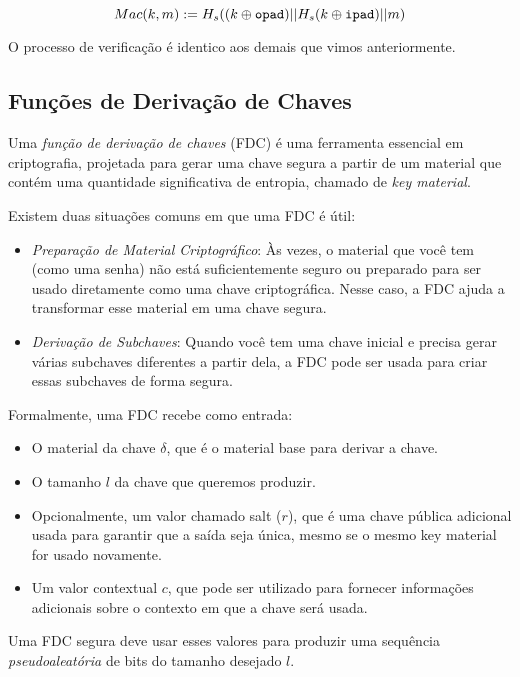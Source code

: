 \begin{displaymath}
Mac(k, m) := H_s((k \oplus \textrm{\tt opad}) || H_s(k \oplus \textrm{\tt ipad}) || m)
\end{displaymath}

O processo de verificação é identico aos demais que vimos anteriormente.

\subsection{Funções de Derivação de Chaves}
\label{sec:kdf}

Uma {\em função de derivação de chaves} (FDC) é uma ferramenta essencial em criptografia, projetada para gerar uma chave segura a partir de um material que contém uma quantidade significativa de entropia, chamado de {\em key material}.

Existem duas situações comuns em que uma FDC é útil:

\begin{itemize}
\item[] {\em Preparação de Material Criptográfico}:
  Às vezes, o material que você tem (como uma senha) não está suficientemente seguro ou preparado para ser usado diretamente como uma chave criptográfica.
  Nesse caso, a FDC ajuda a transformar esse material em uma chave segura.

\item[] {\em Derivação de Subchaves}:
  Quando você tem uma chave inicial e precisa gerar várias subchaves diferentes a partir dela, a FDC pode ser usada para criar essas subchaves de forma segura.
\end{itemize}

Formalmente, uma FDC recebe como entrada:

\begin{itemize}
\item O material da chave $\delta$, que é o material base para derivar a chave.
\item O tamanho $l$ da chave que queremos produzir.
\item Opcionalmente, um valor chamado salt ($r$), que é uma chave pública adicional usada para garantir que a saída seja única, mesmo se o mesmo key material for usado novamente.
\item Um valor contextual $c$, que pode ser utilizado para fornecer informações adicionais sobre o contexto em que a chave será usada.
\end{itemize}

Uma FDC segura deve usar esses valores para produzir uma sequência {\em pseudoaleatória} de bits do tamanho desejado $l$.

